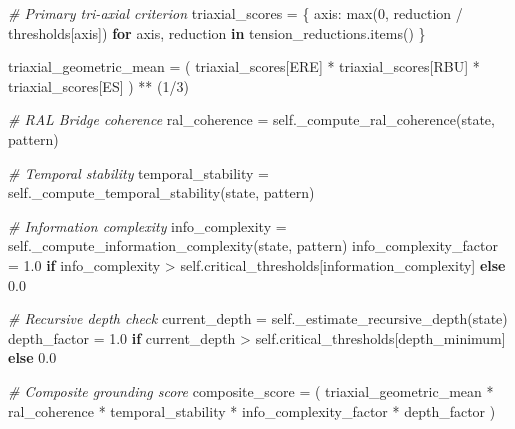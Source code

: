 \documentclass[
]{article}
\newenvironment{Shaded}{}{}
\newcommand{\BuiltInTok}[1]{\textcolor[rgb]{0.00,0.50,0.00}{#1}}
\newcommand{\CommentTok}[1]{\textcolor[rgb]{0.38,0.63,0.69}{\textit{#1}}}
\newcommand{\ControlFlowTok}[1]{\textcolor[rgb]{0.00,0.44,0.13}{\textbf{#1}}}
\newcommand{\DecValTok}[1]{\textcolor[rgb]{0.25,0.63,0.44}{#1}}
\newcommand{\FloatTok}[1]{\textcolor[rgb]{0.25,0.63,0.44}{#1}}
\newcommand{\KeywordTok}[1]{\textcolor[rgb]{0.00,0.44,0.13}{\textbf{#1}}}
\newcommand{\NormalTok}[1]{#1}
\newcommand{\OperatorTok}[1]{\textcolor[rgb]{0.40,0.40,0.40}{#1}}
\newcommand{\StringTok}[1]{\textcolor[rgb]{0.25,0.44,0.63}{#1}}
\newcommand{\VariableTok}[1]{\textcolor[rgb]{0.10,0.09,0.49}{#1}}
\begin{document}
\begin{Shaded}
\begin{Highlighting}[]
        \CommentTok{\# Primary tri{-}axial criterion}
\NormalTok{        triaxial\_scores }\OperatorTok{=}\NormalTok{ \{}
\NormalTok{            axis: }\BuiltInTok{max}\NormalTok{(}\DecValTok{0}\NormalTok{, reduction }\OperatorTok{/}\NormalTok{ thresholds[axis])}
            \ControlFlowTok{for}\NormalTok{ axis, reduction }\KeywordTok{in}\NormalTok{ tension\_reductions.items()}
\NormalTok{        \}}

\NormalTok{        triaxial\_geometric\_mean }\OperatorTok{=}\NormalTok{ (}
\NormalTok{            triaxial\_scores[}\StringTok{\textquotesingle{}ERE\textquotesingle{}}\NormalTok{] }\OperatorTok{*}
\NormalTok{            triaxial\_scores[}\StringTok{\textquotesingle{}RBU\textquotesingle{}}\NormalTok{] }\OperatorTok{*}
\NormalTok{            triaxial\_scores[}\StringTok{\textquotesingle{}ES\textquotesingle{}}\NormalTok{]}
\NormalTok{        ) }\OperatorTok{**}\NormalTok{ (}\DecValTok{1}\OperatorTok{/}\DecValTok{3}\NormalTok{)}

        \CommentTok{\# RAL Bridge coherence}
\NormalTok{        ral\_coherence }\OperatorTok{=} \VariableTok{self}\NormalTok{.\_compute\_ral\_coherence(state, pattern)}

        \CommentTok{\# Temporal stability}
\NormalTok{        temporal\_stability }\OperatorTok{=} \VariableTok{self}\NormalTok{.\_compute\_temporal\_stability(state, pattern)}

        \CommentTok{\# Information complexity}
\NormalTok{        info\_complexity }\OperatorTok{=} \VariableTok{self}\NormalTok{.\_compute\_information\_complexity(state, pattern)}
\NormalTok{        info\_complexity\_factor }\OperatorTok{=} \FloatTok{1.0} \ControlFlowTok{if}\NormalTok{ info\_complexity }\OperatorTok{\textgreater{}} \VariableTok{self}\NormalTok{.critical\_thresholds[}\StringTok{\textquotesingle{}information\_complexity\textquotesingle{}}\NormalTok{] }\ControlFlowTok{else} \FloatTok{0.0}

        \CommentTok{\# Recursive depth check}
\NormalTok{        current\_depth }\OperatorTok{=} \VariableTok{self}\NormalTok{.\_estimate\_recursive\_depth(state)}
\NormalTok{        depth\_factor }\OperatorTok{=} \FloatTok{1.0} \ControlFlowTok{if}\NormalTok{ current\_depth }\OperatorTok{\textgreater{}} \VariableTok{self}\NormalTok{.critical\_thresholds[}\StringTok{\textquotesingle{}depth\_minimum\textquotesingle{}}\NormalTok{] }\ControlFlowTok{else} \FloatTok{0.0}

        \CommentTok{\# Composite grounding score}
\NormalTok{        composite\_score }\OperatorTok{=}\NormalTok{ (}
\NormalTok{            triaxial\_geometric\_mean }\OperatorTok{*}
\NormalTok{            ral\_coherence }\OperatorTok{*}
\NormalTok{            temporal\_stability }\OperatorTok{*}
\NormalTok{            info\_complexity\_factor }\OperatorTok{*}
\NormalTok{            depth\_factor}
\NormalTok{        )}


\end{Highlighting}
\end{Shaded}
\end{document}
